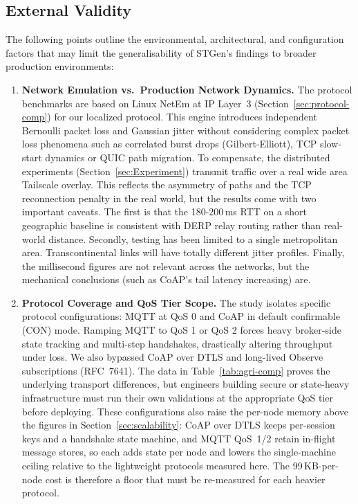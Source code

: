 \documentclass[jsan,article,submit,moreauthors,pdftex]{Definitions/mdpi}
\begin{document}
\subsection*{External Validity}
The following points outline the environmental, architectural, and configuration factors that may limit the generalisability of STGen's findings to broader production environments:


\begin{enumerate}

\item \textbf{Network Emulation vs.\ Production Network Dynamics.}
The protocol benchmarks are based on Linux NetEm at IP Layer~3 (Section~\ref{sec:protocol-comp}) for our localized protocol. This engine introduces independent Bernoulli packet loss and Gaussian jitter without considering complex packet loss phenomena such as correlated burst drops (Gilbert-Elliott), TCP slow-start dynamics or QUIC path migration. To compensate, the distributed experiments (Section~\ref{sec:Experiment}) transmit traffic over a real wide area Tailscale overlay. This reflects the asymmetry of paths and the TCP reconnection penalty in the real world, but the results come with two important caveats. The first is that the 180-200\,ms RTT on a short geographic baseline is consistent with DERP relay routing rather than real-world distance. Secondly, testing has been limited to a single metropolitan area. Transcontinental links will have totally different jitter profiles. Finally, the millisecond figures are not relevant across the networks, but the mechanical conclusions (such as CoAP's tail latency increasing) are.

\item \textbf{Protocol Coverage and QoS Tier Scope.}
The study isolates specific protocol configurations: MQTT at QoS 0 and CoAP in default confirmable (CON) mode. Ramping MQTT to QoS 1 or QoS 2 forces heavy broker-side state tracking and multi-step handshakes, drastically altering throughput under loss. We also bypassed CoAP over DTLS and long-lived Observe subscriptions (RFC~7641). The data in Table~\ref{tab:agri-comp} proves the underlying transport differences, but engineers building secure or state-heavy infrastructure must run their own validations at the appropriate QoS tier before deploying. These configurations also raise the per-node memory above the figures in Section~\ref{sec:scalability}: CoAP over DTLS keeps per-session keys and a handshake state machine, and MQTT QoS~1/2 retain in-flight message stores, so each adds state per node and lowers the single-machine ceiling relative to the lightweight protocols measured here. The 99\,KB-per-node cost is therefore a floor that must be re-measured for each heavier protocol.


\end{enumerate}
\end{document}
